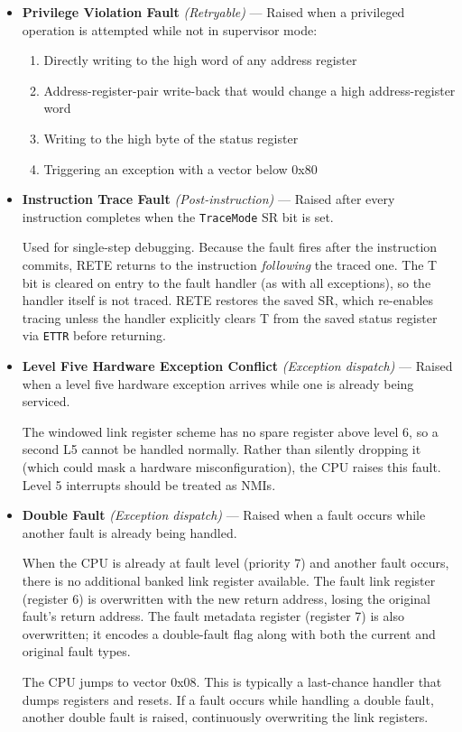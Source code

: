 \begin{itemize}
	\item \textbf{Privilege Violation Fault} \textit{(Retryable)} — Raised when a privileged operation is attempted
	      while not in supervisor mode:
	      \begin{enumerate}
		      \item Directly writing to the high word of any address register
		      \item Address-register-pair write-back that would change a high address-register word
		      \item Writing to the high byte of the status register
		      \item Triggering an exception with a vector below 0x80
	      \end{enumerate}

	\item \textbf{Instruction Trace Fault} \textit{(Post-instruction)} — Raised after every instruction completes
	      when the \texttt{TraceMode} SR bit is set.

	      Used for single-step debugging. Because the fault fires after the instruction commits, RETE returns to the
	      instruction \textit{following} the traced one. The T bit is cleared on entry to the fault handler (as with
	      all exceptions), so the handler itself is not traced. RETE restores the saved SR, which re-enables tracing
	      unless the handler explicitly clears T from the saved status register via \texttt{ETTR} before returning.

	\item \textbf{Level Five Hardware Exception Conflict} \textit{(Exception dispatch)} — Raised when a level five
	      hardware exception arrives while one is already being serviced.

	      The windowed link register scheme has no spare register above level 6, so a second L5 cannot be handled
	      normally. Rather than silently dropping it (which could mask a hardware misconfiguration), the CPU raises
	      this fault. Level 5 interrupts should be treated as NMIs.

	\item \textbf{Double Fault} \textit{(Exception dispatch)} — Raised when a fault occurs while another fault is
	      already being handled.

	      When the CPU is already at fault level (priority 7) and another fault occurs, there is no additional banked
	      link register available. The fault link register (register 6) is overwritten with the new return address,
	      losing the original fault's return address. The fault metadata register (register 7) is also overwritten;
	      it encodes a double-fault flag along with both the current and original fault types.

	      The CPU jumps to vector 0x08. This is typically a last-chance handler that dumps registers and resets. If a
	      fault occurs while handling a double fault, another double fault is raised, continuously overwriting the
	      link registers.

\end{itemize}

